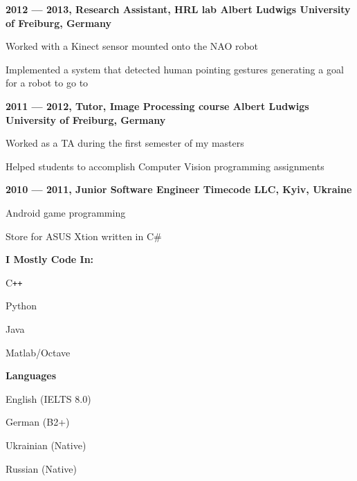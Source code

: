 \documentclass[a4paper,12pt,final]{memoir}
\newcommand{\Sep}{\vspace{1.5em}}
\newcommand{\SmallSep}{\vspace{0.5em}}
\newcommand{\CVSection}[1]
	{\Large\textbf{#1}\par
	\SmallSep\normalsize\normalfont}
\newcommand{\CVItem}[1]
	{\textbf{\color{MidnightBlue} #1}}
\begin{document}
\CVItem{2012 --- 2013, Research Assistant, HRL lab
\newline Albert Ludwigs University of Freiburg, Germany}
\begin{compactitem}[\color{RoyalBlue}$\circ$]
	\item Worked with a Kinect sensor mounted onto the NAO robot
	\item Implemented a system that detected human pointing gestures generating a
	goal for a robot to go to
\end{compactitem}
\SmallSep

\CVItem{2011 --- 2012, Tutor, Image Processing course
\newline Albert Ludwigs University of Freiburg, Germany}
\begin{compactitem}[\color{RoyalBlue}$\circ$]
\item Worked as a TA during the first semester of my masters
\item Helped students to accomplish Computer Vision programming assignments
\end{compactitem}
\SmallSep

\CVItem{2010 --- 2011, Junior Software Engineer
\newline Timecode LLC, Kyiv, Ukraine}
\begin{compactitem}[\color{RoyalBlue}$\circ$]
\item Android game programming
\item Store for ASUS Xtion written in C\#
\end{compactitem}

\SmallSep
\framebreak
\clearpage
\framebreak{}
	\SmallSep{}
	\vspace{-2mm}

	\CVSection{I Mostly Code In:}
	\begin{compactitem}[\color{MidnightBlue}$\circ$]
		\item C\texttt{++}
		\item Python
		\item Java
		\item Matlab/Octave
	\end{compactitem}
	\Sep{}

	\CVSection{Languages}
	\begin{compactitem}[\color{MidnightBlue}$\circ$]
		\item English (IELTS 8.0)
		\item German (B2+)
		\item Ukrainian (Native)
		\item Russian (Native)
	\end{compactitem}
	\Sep{}
\end{document}
